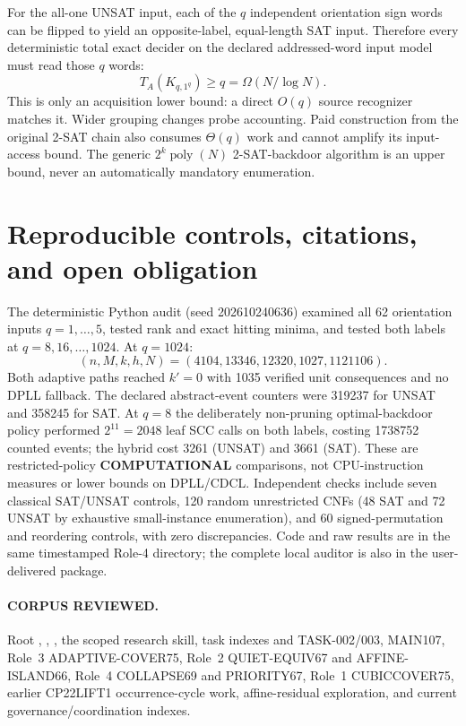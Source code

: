 \documentclass[11pt]{article}
\begin{document}
For the all-one UNSAT input, each of the $q$ independent orientation
sign words can be flipped to yield an opposite-label, equal-length SAT
input. Therefore every deterministic total exact decider on the
declared addressed-word input model must read those $q$ words:
\[
T_A(K_{q,1^q})\ge q=\Omega(N/\log N).
\tag{9}
\]
This is only an acquisition lower bound: a direct $O(q)$ source
recognizer matches it. Wider grouping changes probe accounting.
Paid construction from the original 2-SAT chain also consumes
$\Theta(q)$ work and cannot amplify its input-access bound.
The generic $2^k\operatorname{poly}(N)$ 2-SAT-backdoor algorithm is
an upper bound, never an automatically mandatory enumeration.

\section{Reproducible controls, citations, and open obligation}
The deterministic Python audit (seed 202610240636) examined all 62
orientation inputs $q=1,\ldots,5$, tested rank and exact hitting
minima, and tested both labels at $q=8,16,\ldots,1024$.
At $q=1024$:
\[
(n,M,k,h,N)=(4104,13346,12320,1027,1121106).
\]
Both adaptive paths reached $k'=0$ with 1035 verified unit
consequences and no DPLL fallback. The declared abstract-event
counters were 319237 for UNSAT and 358245 for SAT. At $q=8$ the
deliberately non-pruning optimal-backdoor policy performed $2^{11}=2048$
leaf SCC calls on both labels, costing 1738752 counted events;
the hybrid cost 3261 (UNSAT) and 3661 (SAT).
These are restricted-policy \textbf{COMPUTATIONAL} comparisons, not
CPU-instruction measures or lower bounds on DPLL/CDCL.
Independent checks include seven classical SAT/UNSAT controls,
120 random unrestricted CNFs (48 SAT and 72 UNSAT by exhaustive
small-instance enumeration), and 60 signed-permutation and reordering
controls, with zero discrepancies.
Code and raw results are in the same timestamped Role-4 directory;
the complete local auditor is also in the user-delivered package.

\paragraph{CORPUS REVIEWED.} Root , ,
, the scoped research skill, task indexes and TASK-002/003,
MAIN107, Role~3 ADAPTIVE-COVER75, Role~2 QUIET-EQUIV67 and
AFFINE-ISLAND66, Role~4 COLLAPSE69 and PRIORITY67, Role~1 CUBICCOVER75,
earlier CP22LIFT1 occurrence-cycle work, affine-residual exploration,
and current governance/coordination indexes.
\end{document}
